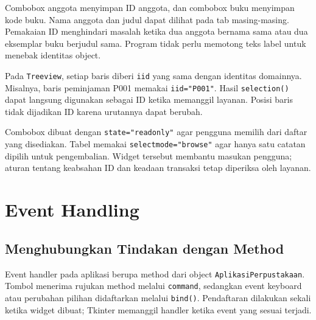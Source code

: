 Combobox anggota menyimpan ID anggota, dan combobox buku menyimpan kode buku. Nama anggota dan judul dapat dilihat pada tab masing-masing. Pemakaian ID menghindari masalah ketika dua anggota bernama sama atau dua eksemplar buku berjudul sama. Program tidak perlu memotong teks label untuk menebak identitas object.

Pada \texttt{Treeview}, setiap baris diberi \texttt{iid} yang sama dengan identitas domainnya. Misalnya, baris peminjaman P001 memakai \texttt{iid="P001"}. Hasil \texttt{selection()} dapat langsung digunakan sebagai ID ketika memanggil layanan. Posisi baris tidak dijadikan ID karena urutannya dapat berubah.

Combobox dibuat dengan \texttt{state="readonly"} agar pengguna memilih dari daftar yang disediakan. Tabel memakai \texttt{selectmode="browse"} agar hanya satu catatan dipilih untuk pengembalian. Widget tersebut membantu masukan pengguna; aturan tentang keabsahan ID dan keadaan transaksi tetap diperiksa oleh layanan.

\section{Event Handling}

\subsection{Menghubungkan Tindakan dengan Method}

Event handler pada aplikasi berupa method dari object \texttt{AplikasiPerpustakaan}. Tombol menerima rujukan method melalui \texttt{command}, sedangkan event keyboard atau perubahan pilihan didaftarkan melalui \texttt{bind()}. Pendaftaran dilakukan sekali ketika widget dibuat; Tkinter memanggil handler ketika event yang sesuai terjadi.

